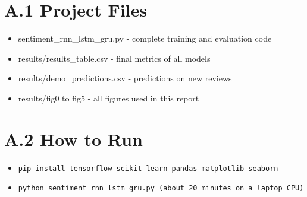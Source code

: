 \documentclass[12pt,a4paper,oneside]{report}
\begin{document}
\section*{A.1 Project Files}
\begin{itemize}
\item sentiment\_rnn\_lstm\_gru.py - complete training and evaluation code
\item results/results\_table.csv - final metrics of all models
\item results/demo\_predictions.csv - predictions on new reviews
\item results/fig0 to fig5 - all figures used in this report
\end{itemize}
\section*{A.2 How to Run}
\begin{itemize}
\item \texttt{pip install tensorflow scikit-learn pandas matplotlib seaborn}
\item \texttt{python sentiment\_rnn\_lstm\_gru.py  (about 20 minutes on a laptop CPU)}
\end{itemize}
\end{document}
